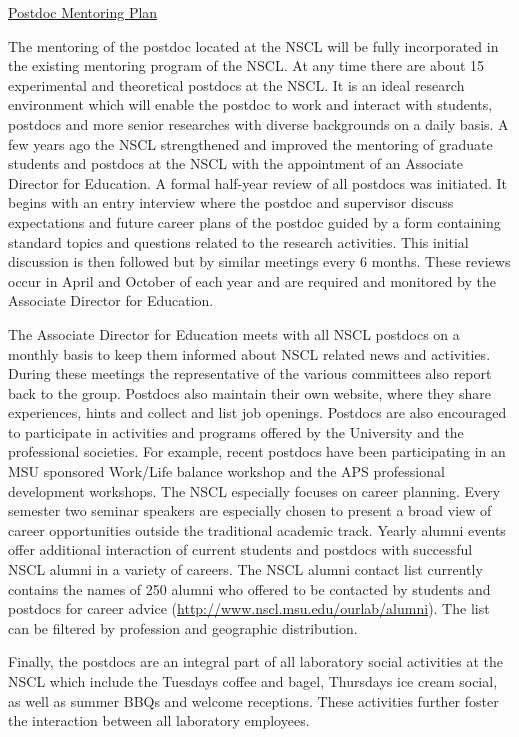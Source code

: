\documentclass[11pt]{article}
\begin{document}
\centerline{\underline{\Large{Postdoc Mentoring Plan}}} 
\medskip
\medskip
The mentoring of the postdoc located at the NSCL will be fully incorporated in the existing mentoring program of the NSCL. At any time there are about 15 experimental and theoretical postdocs at the NSCL. It is an ideal research environment which will enable the postdoc to work and interact with students, postdocs and more senior researches with diverse backgrounds on a daily basis. A few years ago the NSCL strengthened and improved the mentoring of graduate students and postdocs at the NSCL with the appointment of an Associate Director for Education. A formal half-year review of all postdocs was initiated. It begins with an entry interview where the postdoc and supervisor discuss expectations and future career plans of the postdoc guided by a form containing standard topics and questions related to the research activities. This initial discussion is then followed but by similar meetings every 6 months. These reviews occur in April and October of each year and are required and monitored by the Associate Director for Education.

The Associate Director for Education meets with all NSCL postdocs on a monthly basis to keep them informed about NSCL related news and activities. During these meetings the representative of the various committees also report back to the group. Postdocs also maintain their own website, where they share experiences, hints and collect and list job openings. Postdocs are also encouraged to participate in activities and programs offered by the University and the professional societies. For example, recent postdocs have been participating in an MSU sponsored Work/Life balance workshop and the APS professional development workshops. The NSCL especially focuses on career planning. Every semester two seminar speakers are especially chosen to present a broad view of career opportunities outside the traditional academic track. Yearly alumni events offer additional interaction of current students and postdocs with successful  NSCL alumni in a variety of careers.  The NSCL alumni contact list currently contains the names of 250 alumni who offered to be contacted by students and postdocs for career advice (\url{http://www.nscl.msu.edu/ourlab/alumni}).  The list can be filtered by profession and geographic distribution.

Finally, the postdocs are an integral part of all laboratory social activities at the NSCL which include the Tuesdays coffee and bagel, Thursdays ice cream social, as well as summer BBQs and welcome receptions. These activities further foster the interaction between all laboratory employees.
\end{document}
